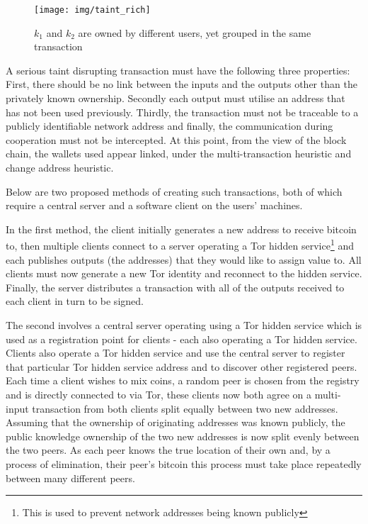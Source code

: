 \begin{figure}[t!]
    \centering
    \texttt{[image: img/taint\_rich]}
      \caption{$k_1$ and $k_2$ are owned by different users, yet grouped in the same transaction}
    \label{fig:taint-rich}
\end{figure}

A serious taint disrupting transaction must have the following three properties:  First, there should be no link between the inputs and the outputs other than the privately known ownership.  Secondly each output must utilise an address that has not been used previously. Thirdly, the transaction must not be traceable to a publicly identifiable network address and finally, the communication during cooperation must not be intercepted.  At this point, from the view of the block chain, the wallets used appear linked, under the multi-transaction heuristic and change address heuristic.

Below are two proposed methods of creating such transactions, both of which require a central server and a software client on the users' machines.

In the first method, the client initially generates a new address to receive bitcoin to, then multiple clients connect to a server operating a Tor\cite{tor} hidden service\footnote{This is used to prevent network addresses being known publicly} and each publishes outputs (the addresses) that they would like to assign value to.  All clients must now generate a new Tor identity and reconnect to the hidden service.  Finally, the server distributes a transaction with all of the outputs received to each client in turn to be signed.

The second involves a central server operating using a Tor hidden service which is used as a registration point for clients - each also operating a Tor hidden service.  Clients also operate a Tor hidden service and use the central server to register that particular Tor hidden service address and to discover other registered peers.  Each time a client wishes to mix coins, a random peer is chosen from the registry and is directly connected to via Tor, these clients now both agree on a multi-input transaction from both clients split equally between two new addresses. Assuming that the ownership of originating addresses was known publicly, the public knowledge ownership of the two new addresses is now split evenly between the two peers.  As each peer knows the true location of their own and, by a process of elimination, their peer's bitcoin this process must take place repeatedly between many different peers.


